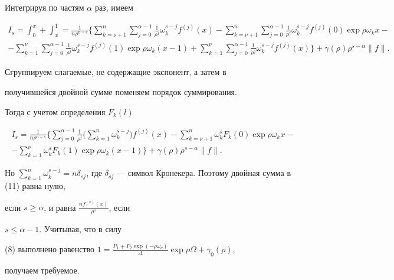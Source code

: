 \begin{pf}


Интегрируя по частям $\alpha$ раз, имеем


\begin{multline*}


I_s=\int_0^x+\int_x^1= \frac 1


{n\rho^{n-s}}\bigg\{\sum\limits_{k=\nu+1}^n\sum\limits_{j=0}^


{\alpha-1} \frac 1{\rho^j}\omega_k^{s-j}f^{(j)}(x)-


\sum\limits_{k=\nu+1}^n\sum\limits_{j=0}^{\alpha-1} \frac 1{\rho^j}


\omega_k^{s-j}f^{(j)}(0)\exp\rho\omega_kx- \\


%


-\sum\limits_{k=1}^{\nu}\sum\limits_


{j=0}^{\alpha-1} \frac 1{\rho^j}\omega_k^{s-j}f^{(j)}(1)


\exp\rho\omega_k(x-1)+


\sum\limits_{k=1}^{\nu}\sum\limits_


{j=0}^{\alpha-1} \frac 1{\rho^j}\omega_k^{s-j}f^{(j)}


(x)\bigg\}+


\gamma(\rho)\rho^{s-\alpha}\|f\|.


\end{multline*}


Сгруппируем слагаемые, не содержащие экспонент, а затем в


получившейся двойной сумме поменяем порядок суммирования.





Тогда с учетом определения $F_k(l)$


\begin{multline}


I_s= \frac 1{n\rho^{n-s}}\bigg\{\sum\limits_{j=0}^


{\alpha-1} \frac 1{\rho^j}\bigg(\sum\limits_{k=1}^n\omega_k^{s-j}\bigg)


f^{(j)}(x)-\sum\limits_{k=\nu+1}^n\omega_k^sF_k(0)\exp\rho\omega_kx- \\


%


-\sum\limits_{k=1}^{\nu}\omega_k^sF_k(1)\exp\rho\omega_k(x-1)\bigg\}


+\gamma(\rho)\rho^{s-\alpha}\|f\|.


\end{multline}


Но $\sum\limits_{k=1}^n\omega_k^{s-j}=n\delta_{sj}$, где $\delta


_{sj}$ --- символ Кронекера. Поэтому двойная сумма в (11) равна нулю,


если $s\ge\alpha$, и равна $ \frac {nf^{(s)}(x)}{\rho^s}$, если


$s\le\alpha-1$. Учитывая, что в силу


(8) выполнено равенство $1= \frac {P_1+P_2


\exp(-\rho\omega_\nu)}{\Delta}\exp\rho\Omega+\gamma_0(\rho)$,


получаем требуемое.


\end{pf}
